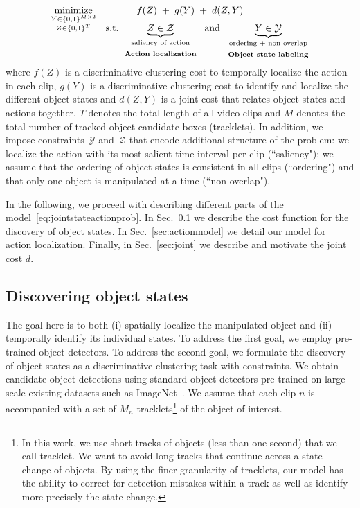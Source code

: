 \begin{align}
\label{eq:jointstateactionprob}
\underset{\substack{Y\in\{0,1\}^{M\times 2}\\Z\in\{0,1\}^T}}{\text{minimize}} \!\! & & & \phantom{aai} f(Z) \; +  \; g(Y) \; + \; d(Z, Y) \\[-5mm]
& & \text{ s.t. }   & \underbrace{Z \in \mathcal{Z}}_{\substack{\text{saliency of action} \\ \\ \text{\textbf{Action localization}}}} \ \text{ and }  \  \underbrace{Y \in \mathcal{Y}}_{\substack{\text{ordering + non overlap}\\ \\ \text{\textbf{Object state labeling}}}}   \nonumber
\end{align}
where $f(Z)$ is a discriminative clustering cost to temporally localize the action in each clip, $g(Y)$ is a discriminative clustering cost to identify and localize the different object states and $d(Z,Y)$ is a joint cost that relates object states and actions together. $T$ denotes the total length of all video clips and $M$ denotes the total number of tracked object candidate boxes (tracklets).
In addition, we impose constraints~$\mathcal{Y}$ and~$\mathcal{Z}$ that encode additional structure of the problem: we localize the action with its most salient time interval per clip (``saliency"); we assume that the ordering of object states is consistent in all clips (``ordering") and that only one object is manipulated at a time (``non overlap").

In the following, we proceed with describing different parts of the model~\eqref{eq:jointstateactionprob}.
In Sec.~\ref{sec:statemodel} we describe the cost function for the discovery of object states. In Sec.~\ref{sec:actionmodel} we detail our model for action localization. Finally,  in Sec.~\ref{sec:joint} we describe and motivate the joint cost $d$.
%
\subsection{Discovering object states}
\label{sec:statemodel}

The goal here is to both (i) spatially localize the manipulated object and (ii) temporally identify its individual states.
To address the first goal, we employ pre-trained object detectors. To address the second goal, we formulate the discovery of object states as a discriminative clustering task with constraints.
We obtain candidate object detections using standard object detectors pre-trained on large scale existing datasets such as ImageNet~\cite{imagenet09}. We assume that each clip $n$ is accompanied with a set of $M_n$ tracklets\footnote{In this work, we use short tracks of objects (less than one second) that we call tracklet. We want to avoid long tracks that continue across a state change of objects. By using the finer granularity of tracklets, our model has the ability to correct for detection mistakes within a track as well as identify more precisely the state change. 
%
} of the object of interest. %

